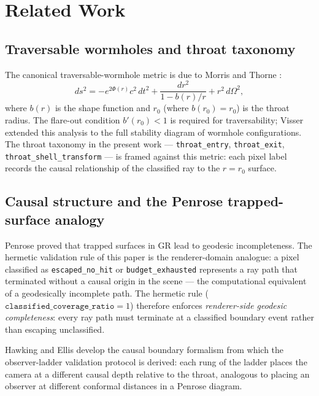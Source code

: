 \documentclass[11pt]{article}
\begin{document}
\section{Related Work}

\subsection{Traversable wormholes and throat taxonomy}

The canonical traversable-wormhole metric is due to Morris and Thorne \cite{morris_thorne1988}:
\begin{equation}
  ds^2 = -e^{2\Phi(r)}c^2\,dt^2 + \frac{dr^2}{1-b(r)/r} + r^2\,d\Omega^2,
\end{equation}
where $b(r)$ is the shape function and $r_0$ (where $b(r_0)=r_0$) is the throat radius.
The flare-out condition $b'(r_0)<1$ is required for traversability; Visser \cite{visser1995}
extended this analysis to the full stability diagram of wormhole configurations.
The throat taxonomy in the present work --- \texttt{throat\_entry},
\texttt{throat\_exit}, \texttt{throat\_shell\_transform} --- is framed against this metric:
each pixel label records the causal relationship of the classified ray to the $r=r_0$ surface.

\subsection{Causal structure and the Penrose trapped-surface analogy}

Penrose \cite{penrose1965} proved that trapped surfaces in GR lead to geodesic
incompleteness.
The hermetic validation rule of this paper is the renderer-domain analogue:
a pixel classified as \texttt{escaped\_no\_hit} or \texttt{budget\_exhausted}
represents a ray path that terminated without a causal origin in the scene ---
the computational equivalent of a geodesically incomplete path.
The hermetic rule ($\texttt{classified\_coverage\_ratio} = 1$) therefore enforces
\textit{renderer-side geodesic completeness}: every ray path must terminate at a
classified boundary event rather than escaping unclassified.

Hawking and Ellis \cite{hawking_ellis1973} develop the causal boundary formalism
from which the observer-ladder validation protocol is derived:
each rung of the ladder places the camera at a different causal depth relative to
the throat, analogous to placing an observer at different conformal distances in a
Penrose diagram.
\end{document}
